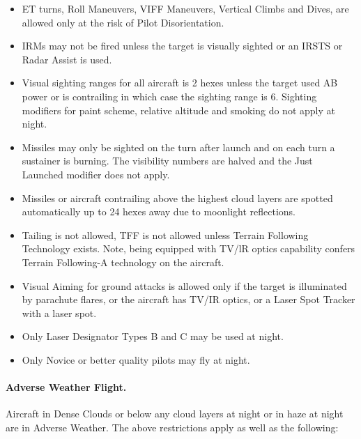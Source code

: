 \begin{advancedrules}
\begin{itemize}
    \item ET turns, Roll Maneuvers, VIFF Maneuvers, Vertical Climbs and Dives,  are allowed only at the risk of Pilot Disorientation.

    \item IRMs may not be fired unless the target is visually sighted or an IRSTS or Radar Assist is used.

    \item Visual sighting ranges for all aircraft is 2 hexes unless the target used AB power or is contrailing in which case the sighting range is 6. Sighting modifiers for paint scheme, relative altitude and smoking do not apply at night.

    \item Missiles may only be sighted on the turn after launch and on each turn a sustainer is burning. The visibility numbers are halved and the Just Launched modifier does not apply.

    \item Missiles or aircraft contrailing above the highest cloud layers are spotted automatically up to 24 hexes away due to moonlight reflections.

    \item Tailing is not allowed, TFF is not allowed unless Terrain Following Technology exists. Note, being equipped with TV/lR optics capability confers Terrain Following-A technology on the aircraft.

    \item Visual Aiming for ground attacks is allowed only if the target is illuminated by parachute flares, or the aircraft has TV/IR optics, or a Laser Spot Tracker with a laser spot.

    \item Only Laser Designator Types B and C may be used at night.

    \item Only Novice or better quality pilots may fly at night.

\end{itemize}

\paragraph{Adverse Weather Flight.} Aircraft in Dense Clouds or below any cloud layers at night or in haze at night are in Adverse Weather. The above restrictions apply as well as the following:


\end{advancedrules}
